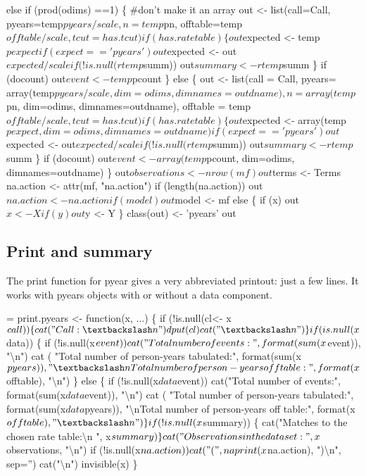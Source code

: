 \documentclass{article}
\begin{document}
\begin{nwchunk}
 else if (prod(odims) ==1) \{  #don't make it an array
     out <- list(call=Call, pyears=temp$pyears/scale, n=temp$pn,
                 offtable=temp$offtable/scale, tcut = has.tcut)
     if (has.ratetable) \{
         out$expected <- temp$pexpect
         if (expect=='pyears') out$expected <- out$expected/scale
         if (!is.null(rtemp$summ)) out$summary <- rtemp$summ
     \}
     if (docount) out$event <- temp$pcount
 \}
 else \{
     out <- list(call = Call,
             pyears= array(temp$pyears/scale, dim=odims, dimnames=outdname),
             n     = array(temp$pn,     dim=odims, dimnames=outdname),
             offtable = temp$offtable/scale, tcut=has.tcut)
     if (has.ratetable) \{
         out$expected <- array(temp$pexpect, dim=odims, dimnames=outdname)
         if (expect=='pyears') out$expected <- out$expected/scale
         if (!is.null(rtemp$summ)) out$summary <- rtemp$summ
     \}
     if (docount)
             out$event <- array(temp$pcount, dim=odims, dimnames=outdname)
 \}
 out$observations <- nrow(mf)
 out$terms <- Terms
 na.action <- attr(mf, "na.action")
 if (length(na.action))  out$na.action <- na.action
 if (model) out$model <- mf
 else \{
     if (x) out$x <- X
     if (y) out$y <- Y
 \}
 class(out) <- 'pyears'
 out
\end{nwchunk}
\subsection{Print and summary}
The print function for pyear gives a very abbreviated
printout: just a few lines.
It works with pyears objects with or without a data component.

\begin{nwchunk}
=
 print.pyears <- function(x, ...) \{
     if (!is.null(cl<- x$call)) \{
         cat("Call:{\textbackslash}n")
         dput(cl)
         cat("{\textbackslash}n")
         \}
 
     if (is.null(x$data)) \{
         if (!is.null(x$event))
             cat("Total number of events:", format(sum(x$event)), "{\textbackslash}n")
         cat (   "Total number of person-years tabulated:", 
              format(sum(x$pyears)),
              "{\textbackslash}nTotal number of person-years off table:",
              format(x$offtable), "{\textbackslash}n")
         \}
     else \{
         if (!is.null(x$data$event))
             cat("Total number of events:", format(sum(x$data$event)), "{\textbackslash}n")
         cat (   "Total number of person-years tabulated:", 
              format(sum(x$data$pyears)),
              "{\textbackslash}nTotal number of person-years off table:",
              format(x$offtable), "{\textbackslash}n")
         \}
     if (!is.null(x$summary)) \{
         cat("Matches to the chosen rate table:{\textbackslash}n  ", 
             x$summary)
         \}
     cat("Observations in the data set:", x$observations, "{\textbackslash}n")
     if (!is.null(x$na.action))
       cat("  (", naprint(x$na.action), "){\textbackslash}n", sep='')
     cat("{\textbackslash}n")
     invisible(x)
 \}
\end{nwchunk}
\end{document}
